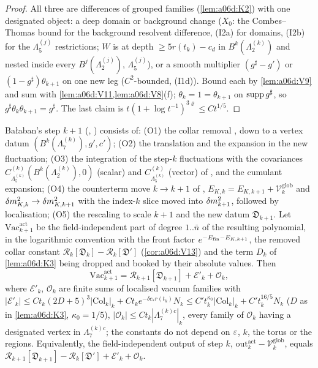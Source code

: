 \begin{proof}
All three are differences of grouped families (\cref{lem:a06d:K2}) with one designated object: a deep domain or background change ($X_0$: the Combes--Thomas bound for the background resolvent difference, (I2a) for domains, (I2b) for the $\Lambda^{(j)}_5$ restrictions; $W$ is at depth $\ge5r(t_k)-c_d$ in $B^k(\Lambda^{(k)}_2)$ and nested inside every $B^j(\Lambda^{(j)}_2)$, $\Lambda^{(j)}_5$), or a smooth multiplier $(g^\sharp-g')$ or $(1-g^\sharp)\theta_{k+1}$ on one new leg ($C^2$-bounded, (I1d)). Bound each by \cref{lem:a06d:V9} and sum with \cref{lem:a06d:V11,lem:a06d:V8}(f); $\theta_k=1=\theta_{k+1}$ on $\operatorname{supp} g^\sharp$, so $g^\sharp\theta_k\theta_{k+1}=g^\sharp$. The last claim is $t(1+\log t^{-1})^{3\varrho}\le Ct^{1/5}$.
\end{proof}

\begin{theorem}\label{thm:a06d:V14}
Ba{\l}aban's step $k+1$ (\cite[p.~412]{Ba3}, \cite[pp.~569--582]{Ba2}) consists of: (O1) the collar removal \cite[(2.57)]{Ba2}, down to a vertex datum $(B^k(\Lambda^{(k)}_7),g',c')$; (O2) the translation and the expansion in the new fluctuation; (O3) the integration of the step-$k$ fluctuations with the covariances $C^{(k)}_{\Lambda^{(k)}_5}(B^k(\Lambda^{(k)}_2),0)$ (scalar) and $C^{(k)}_{\Lambda^{(k)}_5}$ (vector) of \cite[p.~419]{Ba3}, and the cumulant expansion; (O4) the counterterm move $k\to k+1$ of \cite[p.~422]{Ba3}, $E_{K,k}=E_{K,k+1}+\mathcal V^{\mathrm{glob}}_k$ and $\delta m^2_{K,k}\to\delta m^2_{K,k+1}$ with the index-$k$ slice moved into $\delta m^2_{k+1}$, followed by localisation; (O5) the rescaling to scale $k+1$ and the new datum $\mathfrak D_{k+1}$. Let $\mathrm{Vac}^{\mathrm{act}}_{k+1}$ be the field-independent part of degree $1..\bar n$ of the resulting polynomial, in the logarithmic convention with the front factor $e^{-E_{\mathrm{fin}}-E_{K,k+1}}$, the removed collar constant $\mathcal R_k[\mathfrak D_k]-\mathcal R_k[\mathfrak D']$ (\cref{cor:a06d:V13}) and the term $D_k$ of \cref{lem:a06d:K3} being dropped and booked by their absolute values. Then
\[
\mathrm{Vac}^{\mathrm{act}}_{k+1}=\mathcal R_{k+1}[\mathfrak D_{k+1}]+\mathcal E'_k+\mathcal O_k,
\]
where $\mathcal E'_k$, $\mathcal O_k$ are finite sums of localised vacuum families with $|\mathcal E'_k|\le Ct_k(2D+5)^3|\mathrm{Col}_k|_k+Ct_ke^{-\delta c_*r(t_k)}N_k\le C't_k^{\kappa_0}|\mathrm{Col}_k|_k+C't_k^{16/5}N_k$ ($D$ as in \cref{lem:a06d:K3}, $\kappa_0=1/5$), $|\mathcal O_k|\le Ct_k|\Lambda^{(k)c}_7|_k$, every family of $\mathcal O_k$ having a designated vertex in $\Lambda^{(k)c}_7$; the constants do not depend on $\varepsilon$, $k$, the torus or the regions. Equivalently, the field-independent output of step $k$, $\mathrm{out}^{\mathrm{act}}_k-\mathcal V^{\mathrm{glob}}_k$, equals $\mathcal R_{k+1}[\mathfrak D_{k+1}]-\mathcal R_k[\mathfrak D']+\mathcal E'_k+\mathcal O_k$.
\end{theorem}


